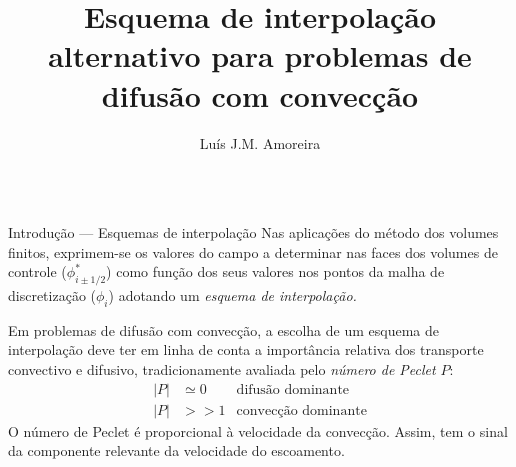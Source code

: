 \documentclass[final,t]{beamer}
\title{\LARGE Esquema de interpolação alternativo para problemas de difusão com
convecção}
\author{Luís J.M. Amoreira}
\institute{\ }
\begin{document}
\begin{frame}{}
\begin{columns}[t]

\begin{column}{0.488\linewidth}
    \begin{block}{Introdução --- Esquemas de interpolação}
        Nas aplicações do método dos volumes finitos, exprimem-se os valores do
        campo a determinar nas faces dos volumes de controle
        ($\phi^*_{i\pm1/2}$) como função dos seus valores nos pontos da malha de
        discretização ($\phi_i$) adotando um \emph{esquema de interpolação.}

        {\centering

        }
        Em problemas de difusão com convecção, a escolha de um esquema de
        interpolação deve ter em linha de conta a importância relativa dos
        transporte convectivo e difusivo, tradicionamente avaliada pelo 
        \emph{número de Peclet} $P$:
        \begin{equation*}
            \begin{aligned}
                |P|&\simeq0&\text{difusão dominante}\\
                |P|&>>1&\text{convecção dominante}
            \end{aligned}
        \end{equation*}
        O número de Peclet é proporcional à velocidade da convecção. Assim, tem
        o sinal da componente relevante da velocidade do escoamento.
    \end{block}


\end{column}
\end{columns}
\end{frame}
\end{document}

